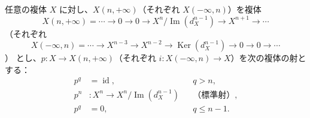 任意の複体 $X$ に対し、$X(n,+\infty)$（それぞれ $X(-\infty,n)$）を複体
\[
X(n,+\infty)=\cdots\longrightarrow0\longrightarrow0
\longrightarrow X^n/\operatorname{Im}(d_X^{n-1})
\longrightarrow X^{n+1}\longrightarrow\cdots
\]
（それぞれ
\[
X(-\infty,n)=\cdots\longrightarrow X^{n-3}\longrightarrow X^{n-2}
\longrightarrow\operatorname{Ker}(d_X^{n-1})
\longrightarrow0\longrightarrow0\longrightarrow\cdots
\]）
とし、$p\colon X\longrightarrow X(n,+\infty)$（それぞれ
$i\colon X(-\infty,n)\longrightarrow X$）を次の複体の射とする：
\[
\begin{aligned}
p^q&=\operatorname{id},&&q>n,\\
p^n&\colon X^n\longrightarrow X^n/\operatorname{Im}(d_X^{n-1})
  &&\text{（標準射）},\\
p^q&=0,&&q\leq n-1.
\end{aligned}
\]
\endgroup
